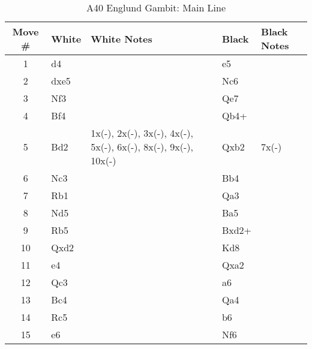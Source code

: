 \begin{table}[htbp]
\centering
\scriptsize
\caption{A40 Englund Gambit: Main Line}
\begin{tabular}{|c|l|p{5cm}|l|p{5cm}|}
\hline
\textbf{Move \#} & \textbf{White} & \textbf{White Notes} & \textbf{Black} & \textbf{Black Notes} \\
\hline
1  & d4    &                     & e5    &                        \\
2  & dxe5  &                     & Nc6   &                        \\
3  & Nf3   &                     & Qe7   &                        \\
4  & Bf4   &                     & Qb4+  &                        \\
5  & Bd2   & 1x(-), 2x(-), 3x(-), 4x(-), 5x(-), 6x(-), 8x(-), 9x(-), 10x(-) & Qxb2  & 7x(-) \\
6  & Nc3   &                     & Bb4   &                        \\
7  & Rb1   &                     & Qa3   &                        \\
8  & Nd5   &                     & Ba5   &                        \\
9  & Rb5   &                     & Bxd2+ &                        \\
10 & Qxd2  &                     & Kd8   &                        \\
11 & e4    &                     & Qxa2  &                        \\
12 & Qc3   &                     & a6    &                        \\
13 & Bc4   &                     & Qa4   &                        \\
14 & Rc5   &                     & b6    &                        \\
15 & e6    &                     & Nf6   &                        \\
\hline
\end{tabular}
\end{table}


